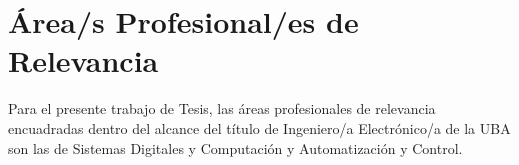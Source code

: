 \section{Área/s Profesional/es de Relevancia}

Para el presente trabajo de Tesis, las áreas profesionales de relevancia encuadradas dentro del alcance del título de Ingeniero/a Electrónico/a de la UBA son las de Sistemas Digitales y Computación y Automatización y Control.